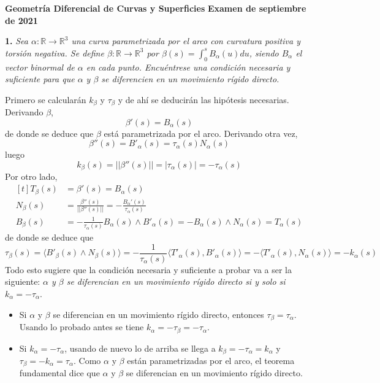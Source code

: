 \documentclass[12pt]{report}
\newcommand{\R}{\mathbb R}
\begin{document}
\small

\textbf{Geometría Diferencial de Curvas y Superficies} \hfill \textbf{Examen de septiembre de 2021}
\linebreak

\textbf{1. } \textit{Sea $\alpha \colon \R \to \R^3$ una curva parametrizada por el arco con curvatura positiva y torsión negativa. Se define $\beta \colon \R \to \R^3$ por $\beta(s) = \int_0^s B_\alpha(u)du$, siendo $B_\alpha$ el vector binormal de $\alpha$ en cada punto. Encuéntrese una condición necesaria y suficiente para que $\alpha$ y $\beta$ se diferencien en un movimiento rígido directo.}

\vspace{2mm}
Primero se calcularán $k_\beta$ y $\tau_\beta$ y de ahí se deducirán las hipótesis necesarias. Derivando $\beta$,
\[\beta'(s) = B_\alpha(s)\]
de donde se deduce que $\beta$ está parametrizada por el arco. Derivando otra vez,
\[\beta''(s) = B'_\alpha(s) = \tau_\alpha(s)N_\alpha(s)\]
luego
\[k_\beta(s) = ||\beta''(s)|| = |\tau_\alpha(s)| = -\tau_\alpha(s)\]
Por otro lado,
\[
\begin{aligned}[t]
T_\beta(s) &= \beta'(s) = B_\alpha(s) \\
N_\beta(s) &= \frac{\beta''(s)}{||\beta''(s)||} = -\frac{B_\alpha'(s)}{\tau_\alpha(s)} \\
B_\beta(s) &= -\frac{1}{\tau_\alpha(s)}B_\alpha(s) \wedge B'_\alpha(s) = -B_\alpha(s) \wedge N_\alpha(s) = T_\alpha(s)
\end{aligned}
\]
de donde se deduce que
\[\tau_\beta(s) = \langle B'_\beta(s) \wedge N_\beta(s) \rangle =-\frac{1}{\tau_\alpha(s)} \langle T'_\alpha(s),B'_\alpha(s) \rangle = - \langle T'_\alpha(s),N_\alpha(s) \rangle = -k_\alpha(s) \]
Todo esto sugiere que la condición necesaria y suficiente a probar va a ser la siguiente: \textit{$\alpha$ y $\beta$ se diferencian en un movimiento rígido directo si y solo si $k_\alpha = -\tau_\alpha$}.

\begin{itemize}
    \item[{\fbox[rb]{$\Rightarrow$}}] Si $\alpha$ y $\beta$ se diferencian en un movimiento rígido directo, entonces $\tau_\beta = \tau_\alpha$. Usando lo probado antes se tiene $k_\alpha = -\tau_\beta = -\tau_\alpha$.
    \item[{\fbox[rb]{$\Leftarrow$}}] Si $k_\alpha = -\tau_\alpha$, usando de nuevo lo de arriba se llega a $k_\beta = -\tau_\alpha = k_\alpha$ y $\tau_\beta = -k_\alpha = \tau_\alpha$. Como $\alpha$ y $\beta$ están parametrizadas por el arco, el teorema fundamental dice que $\alpha$ y $\beta$ se diferencian en un movimiento rígido directo.
\end{itemize}
\end{document}
